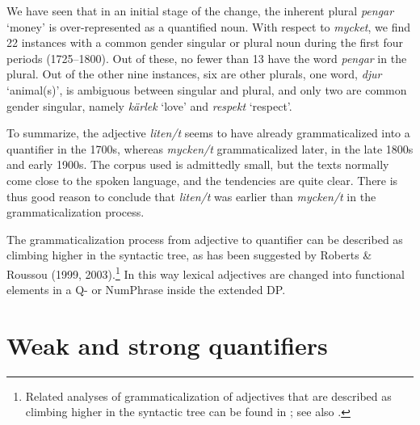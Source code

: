 \documentclass[output=paper]{langscibook}
\begin{document}
We have seen that in an initial stage of the change, the inherent plural \textit{pengar} ‘money’ is over-represented as a quantified noun. With respect to \textit{mycket}, we find 22 instances with a common gender singular or plural noun during the first four periods (1725–1800). Out of these, no fewer than 13 have the word \textit{pengar} in the plural. Out of the other nine instances, six are other plurals, one word, \textit{djur} ‘animal(s)’, is ambiguous between singular and plural, and only two are common gender singular, namely \textit{kärlek} ‘love’ and \textit{respekt} ‘respect’. 



To summarize, the adjective \textit{liten/t} seems to have already grammaticalized into a quantifier in the 1700s, whereas \textit{mycken/t} grammaticalized later, in the late 1800s and early 1900s. The corpus used is admittedly small, but the texts normally come close to the spoken language, and the tendencies are quite clear. There is thus good reason to conclude that \textit{liten/t} was earlier than \textit{mycken/t} in the grammaticalization process. 



The grammaticalization process from adjective to quantifier can be described as climbing higher in the syntactic tree, as has been suggested by Roberts \& Roussou (1999, 2003).\footnote{Related analyses of grammaticalization of adjectives that are described as climbing higher in the syntactic tree can be found in \citet{Oxford2017}; see also .} In this way lexical adjectives are changed into functional elements in a Q- or NumPhrase inside the extended DP.


\section{Weak and strong quantifiers}\label{sec:delsing:5}
\end{document}
